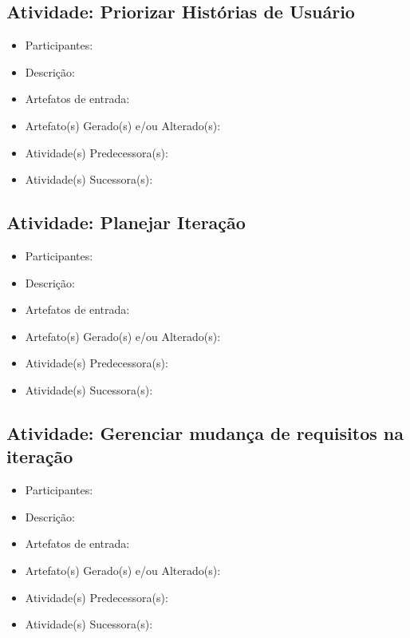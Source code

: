 \subsection{Atividade: Priorizar Histórias de Usuário}
\begin{itemize}
\item Participantes: 

\item Descrição: 

\item Artefatos de entrada: 

\item Artefato(s) Gerado(s) e/ou Alterado(s): 

\item Atividade(s) Predecessora(s): 
  
\item Atividade(s) Sucessora(s): 
\end{itemize}

\subsection{Atividade: Planejar Iteração}
\begin{itemize}
\item Participantes: 

\item Descrição: 

\item Artefatos de entrada: 

\item Artefato(s) Gerado(s) e/ou Alterado(s): 

\item Atividade(s) Predecessora(s): 
  
\item Atividade(s) Sucessora(s): 
\end{itemize}

\subsection{Atividade: Gerenciar mudança de requisitos na iteração}
\begin{itemize}
\item Participantes: 

\item Descrição: 

\item Artefatos de entrada: 

\item Artefato(s) Gerado(s) e/ou Alterado(s): 

\item Atividade(s) Predecessora(s): 
  
\item Atividade(s) Sucessora(s): 
\end{itemize}

